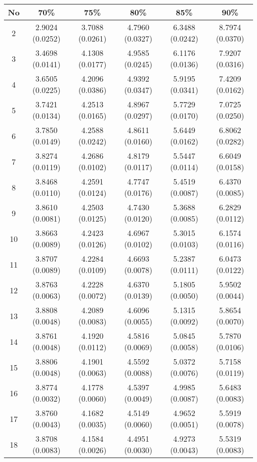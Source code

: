 \begin{table}
\centering

\begin{tabular}{c|c|c|c|c|c}
No  & 70\%            &75\%             &80\%             &85\%             &90\%\\
\hline
2   &2.9024 (0.0252)  &3.7088 (0.0261)  &4.7960 (0.0327)  &6.3488 (0.0242)  &8.7974 (0.0370)\\
3   &3.4698 (0.0141)  &4.1308 (0.0177)  &4.9585 (0.0245)  &6.1176 (0.0136)  &7.9207 (0.0316)\\
4   &3.6505 (0.0225)  &4.2096 (0.0386)  &4.9392 (0.0347)  &5.9195 (0.0341)  &7.4209 (0.0162)\\
5   &3.7421 (0.0134)  &4.2513 (0.0165)  &4.8967 (0.0297)  &5.7729 (0.0170)  &7.0725 (0.0250)\\
6   &3.7850 (0.0149)  &4.2588 (0.0242)  &4.8611 (0.0160)  &5.6449 (0.0162)  &6.8062 (0.0282)\\
7   &3.8274 (0.0119)  &4.2686 (0.0102)  &4.8179 (0.0117)  &5.5447 (0.0114)  &6.6049 (0.0158)\\
8   &3.8468 (0.0110)  &4.2591 (0.0124)  &4.7747 (0.0176)  &5.4519 (0.0087)  &6.4370 (0.0085)\\
9   &3.8610 (0.0081)  &4.2503 (0.0125)  &4.7430 (0.0120)  &5.3688 (0.0085)  &6.2829 (0.0112)\\
10  &3.8663 (0.0089)  &4.2423 (0.0126)  &4.6967 (0.0102)  &5.3015 (0.0103)  &6.1574 (0.0116)\\
11  &3.8707 (0.0089)  &4.2284 (0.0109)  &4.6693 (0.0078)  &5.2387 (0.0111)  &6.0473 (0.0122)\\
12  &3.8763 (0.0063)  &4.2228 (0.0072)  &4.6370 (0.0139)  &5.1805 (0.0050)  &5.9502 (0.0044)\\
13  &3.8808 (0.0048)  &4.2089 (0.0083)  &4.6096 (0.0055)  &5.1315 (0.0092)  &5.8654 (0.0070)\\
14  &3.8761 (0.0048)  &4.1920 (0.0112)  &4.5816 (0.0069)  &5.0845 (0.0058)  &5.7870 (0.0106)\\
15  &3.8806 (0.0048)  &4.1901 (0.0063)  &4.5592 (0.0088)  &5.0372 (0.0076)  &5.7158 (0.0119)\\
16  &3.8774 (0.0032)  &4.1778 (0.0060)  &4.5397 (0.0049)  &4.9985 (0.0087)  &5.6483 (0.0083)\\
17  &3.8760 (0.0043)  &4.1682 (0.0035)  &4.5149 (0.0060)  &4.9652 (0.0051)  &5.5919 (0.0078)\\
18  &3.8708 (0.0083)  &4.1584 (0.0026)  &4.4951 (0.0030)  &4.9273 (0.0043)  &5.5319 (0.0083)\\

\end{tabular}
\end{table}
